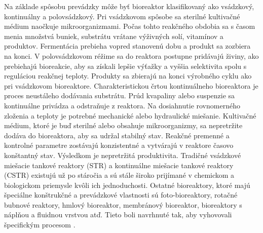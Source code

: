 Na základe spôsobu prevádzky môže byť bioreaktor klasifikovaný ako vsádzkový, kontinuálny a polovsádzkový. 
Pri vsádzkovom spôsobe sa sterilné kultivačné médium naočkuje mikroorganizmami. Počas tohto reakčného obdobia sa s časom menia množstvá buniek, substrátu vrátane výživných solí, vitamínov a produktov. Fermentácia prebieha vopred stanovenú dobu a produkt sa zozbiera na konci.
V polovsádzkovom réžime sa do reaktora postupne pridávajú živiny, ako prebiehajú bioreakcie, aby sa získali lepšie výťažky a vyššia selektivita spolu s reguláciou reakčnej teploty. Produkty sa zbierajú na konci výrobného cyklu ako pri vsádzkovom bioreaktore. 
Charakteristickou črtou kontinuálneho bioreaktora je proces neustáleho dodávania substrátu. Prúd kvapaliny alebo suspenzie sa kontinuálne privádza a odstraňuje z reaktora. Na dosiahnutie rovnomerného zloženia a teploty je potrebné mechanické alebo hydraulické miešanie. Kultivačné médium, ktoré je buď sterilné alebo obsahuje mikroorganizmy, sa nepretržite dodáva do bioreaktora, aby sa udržal stabilný stav. Reakčné premenné a kontrolné parametre zostávajú konzistentné a vytvárajú v reaktore časovo konštantný stav. Výsledkom je nepretržitá produktivita.
Tradičné vsádzkové miešacie tankové reaktory (STR) a kontinuálne miešacie tankové
reaktory (CSTR) existujú už po stáročia a sú stále široko prijímané v chemickom a biologickom priemysle kvôli ich jednoduchosti. Ostatné bioreaktory, ktoré majú špeciálne konštrukčné a prevádzkové vlastnosti sú foto-bioreaktory, rotačné bubnové reaktory, hmlový bioreaktor, membránový bioreaktor, bioreaktory s náplňou a fluidnou vrstvou atď. Tieto boli navrhnuté tak, aby vyhovovali špecifickým procesom \cite{ref1}.
